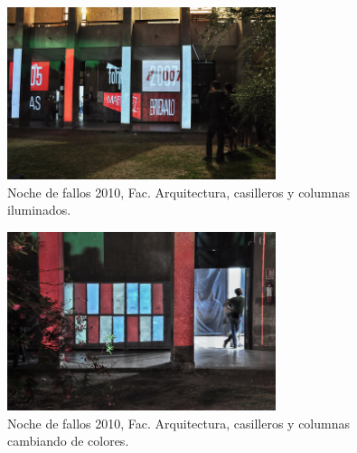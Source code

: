 \begin{figure}[H]
  \centering
    \includegraphics[width=0.7\textwidth]{./Cap7_conclusiones/Arqui2.jpg}
  \caption[http://www.farq.edu.uy/patio/conferencias-exposiciones-y-seminarios/noche-de-fallos-7.html]{Noche de fallos 2010, Fac. Arquitectura, casilleros y columnas iluminados.}
  \label{fig:Arquitectura2}
\end{figure}

\begin{figure}[H]
  \centering
    \includegraphics[width=0.7\textwidth]{./Cap7_conclusiones/Arqui3.jpg}
  \caption[http://www.farq.edu.uy/patio/conferencias-exposiciones-y-seminarios/noche-de-fallos-7.html]{Noche de fallos 2010, Fac. Arquitectura, casilleros y columnas cambiando de colores.}
  \label{fig:Arquitectura3}
\end{figure}

